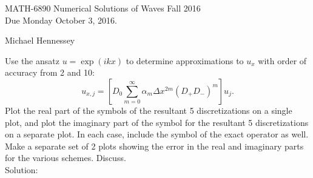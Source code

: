
\pagestyle{empty}


\begin{center}
\large{ MATH-6890 \hspace{1in} Numerical Solutions of Waves  \hspace{1in}Fall 2016 \\ Due Monday October 3, 2016.}\end{center}
Michael Hennessey

\bigskip
{} \ec
\benum 

\item Use the ansatz $u=\exp(ikx)$ to determine approximations to $u_x$ with order of accuracy from 2 and 10:
$$ u_{x,j}=\left[D_0\sum_{m=0}^\infty \alpha_m\Delta x^{2m}(D_+D_-)^m\right]u_j.$$
Plot the real part of the symbols of the resultant 5 discretizations on a single plot, and plot the imaginary part of the symbol for the resultant 5 discretizations on a separate plot. In each case, include the symbol of the exact operator as well. Make a separate set of 2 plots showing the error in the real and imaginary parts for the various schemes. Discuss.\\

Solution:\\

